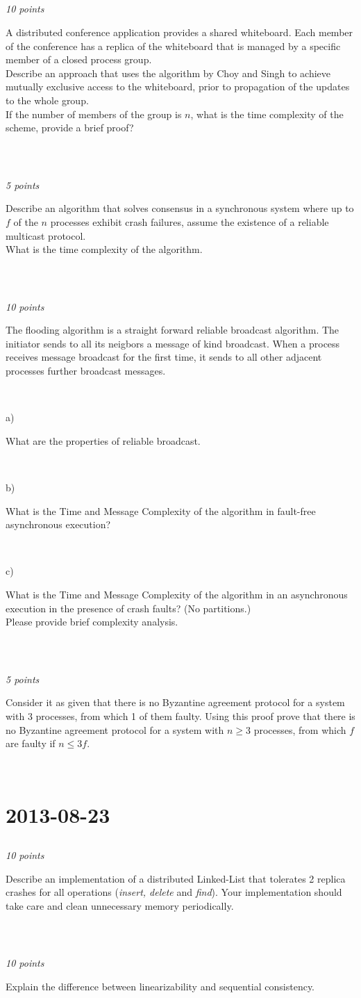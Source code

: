 \documentclass[a4paper]{article}
\newcommand{\points}[1]{\subsection{} \textit{#1 points}\\}
\newcommand{\question}[2][]{
  \noindent
  \parbox[t]{\textwidth}{#1 \parbox[t]{0.95\textwidth}{#2}}\\
}
\begin{document}
\points{10}
\question{A distributed conference application provides a shared
  whiteboard. Each member of the conference has a replica of the
  whiteboard that is managed by a specific member of a closed process
  group. \\
  Describe an approach that uses the algorithm by Choy and Singh to
  achieve mutually exclusive access to the whiteboard, prior to
  propagation of the updates to the whole group. \\
  If the number of members of the group is $n$, what is the time
  complexity of the scheme, provide a brief proof?}

\points{5}
\question{Describe an algorithm that solves consensus in a synchronous
  system where up to $f$ of the $n$ processes exhibit crash failures,
  assume the existence of a reliable multicast protocol. \\
  What is the time complexity of the algorithm.}

\points{10}
\question{The flooding algorithm is a straight forward reliable
  broadcast algorithm. The initiator sends to all its neigbors a
  message of kind broadcast. When a process receives message broadcast
  for the first time, it sends to all other adjacent processes
  further broadcast messages.}
\question[a)]{What are the properties of reliable broadcast.}
\question[b)]{What is the Time and Message Complexity of the algorithm
  in fault-free asynchronous execution?}
\question[c)]{What is the Time and Message Complexity of the algorithm
  in an asynchronous execution in the presence of crash faults? (No
  partitions.) \\
  Please provide brief complexity analysis.}

\points{5}
\question{Consider it as given that there is no Byzantine agreement
  protocol for a system with 3 processes, from which 1 of them
  faulty. Using this proof prove that there is no Byzantine agreement
  protocol for a system with $n \geq 3$ processes, from which $f$ are
  faulty if $n \leq 3f$.}


\section{2013-08-23}
\points{10}
\question{Describe an implementation of a distributed
  Linked-List that tolerates 2 replica crashes for all operations
  (\textit{insert, delete} and \textit{find}). Your implementation
  should take care and clean unnecessary memory periodically.}

\points{10}
\question{Explain the difference between linearizability
  and sequential consistency.}
\end{document}
